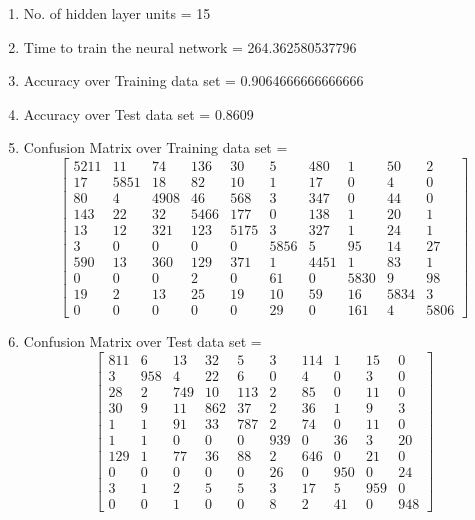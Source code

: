 \documentclass[11pt]{article}
\begin{document}
\hline
\begin{enumerate}
\item No. of hidden layer units = 15
\item Time to train the neural network = 264.362580537796
\item Accuracy over Training data set = 0.9064666666666666
\item Accuracy over Test data set = 0.8609
\item Confusion Matrix over Training data set = 
\begin{equation}
  \begin{bmatrix}
5211 & 11 & 74 & 136 & 30 & 5 & 480 & 1 & 50 & 2\\
17 & 5851 & 18 & 82 & 10 & 1 & 17 & 0 & 4 & 0\\
80 & 4 & 4908 & 46 & 568 & 3 & 347 & 0 & 44 & 0\\
143 & 22 & 32 & 5466 & 177 & 0 & 138 & 1 & 20 & 1\\
13 & 12 & 321 & 123 & 5175 & 3 & 327 & 1 & 24 & 1\\
3 & 0 & 0 & 0 & 0 & 5856 & 5 & 95 & 14 & 27\\
590 & 13 & 360 & 129 & 371 & 1 & 4451 & 1 & 83 & 1\\
0 & 0 & 0 & 2 & 0 & 61 & 0 & 5830 & 9 & 98\\
19 & 2 & 13 & 25 & 19 & 10 & 59 & 16 & 5834 & 3\\
0 & 0 & 0 & 0 & 0 & 29 & 0 & 161 & 4 & 5806
  \end{bmatrix}
\end{equation}
\item Confusion Matrix over Test data set = 
\begin{equation}
  \begin{bmatrix}
811 & 6 & 13 & 32 & 5 & 3 & 114 & 1 & 15 & 0\\
3 & 958 & 4 & 22 & 6 & 0 & 4 & 0 & 3 & 0\\
28 & 2 & 749 & 10 & 113 & 2 & 85 & 0 & 11 & 0\\
30 & 9 & 11 & 862 & 37 & 2 & 36 & 1 & 9 & 3\\
1 & 1 & 91 & 33 & 787 & 2 & 74 & 0 & 11 & 0\\
1 & 1 & 0 & 0 & 0 & 939 & 0 & 36 & 3 & 20\\
129 & 1 & 77 & 36 & 88 & 2 & 646 & 0 & 21 & 0\\
0 & 0 & 0 & 0 & 0 & 26 & 0 & 950 & 0 & 24\\
3 & 1 & 2 & 5 & 5 & 3 & 17 & 5 & 959 & 0\\
0 & 0 & 1 & 0 & 0 & 8 & 2 & 41 & 0 & 948
  \end{bmatrix}
\end{equation}
\end{enumerate}
\end{document}
